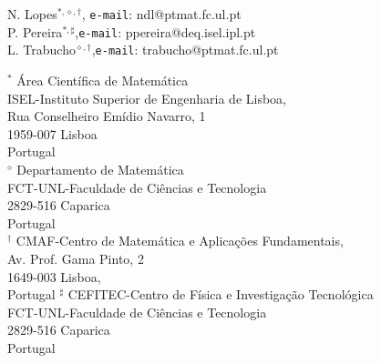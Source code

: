 \begin{center}
N. Lopes\(^{\ast,\diamond,\dagger}\), {\tt e-mail}: ndl@ptmat.fc.ul.pt\\
\quad P. Pereira\(^{\ast,\sharp}\),{\tt e-mail}: ppereira@deq.isel.ipl.pt\\
L. Trabucho\(^{\diamond,\dagger}\),{\tt e-mail}: trabucho@ptmat.fc.ul.pt
\end{center}
\vskip0.2in
{
\noindent \(^{\ast}\) \'{A}rea Cient\'{i}fica de Matem\'{a}tica\\
ISEL-Instituto Superior de Engenharia de Lisboa,
\\
Rua Conselheiro Em\'{i}dio Navarro, 1\\
1959-007 Lisboa\\
Portugal\\
}
\vskip0.2in
{
\noindent \(^{\diamond}\)
Departamento de Matem\'{a}tica\\
FCT-UNL-Faculdade de Ci\^{e}ncias e Tecnologia\\
2829-516 Caparica\\
Portugal\\
}
\vskip0.2in
{
\noindent \(^{\dagger}\)
CMAF-Centro de Matem\'{a}tica e Aplica\c{c}\~{o}es
Fundamentais,\\
Av. Prof. Gama Pinto, 2\\
1649-003 Lisboa,\\
Portugal
}
\vskip0.2in
{
\noindent \(^{\sharp}\)
CEFITEC-Centro de F\'{i}sica e Investiga\c{c}\~ao Tecnol\'{o}gica\\
FCT-UNL-Faculdade de Ci\^{e}ncias e Tecnologia\\
2829-516 Caparica\\
Portugal\\
}
\vfill

